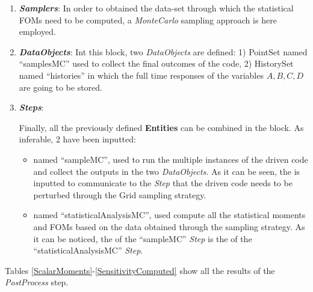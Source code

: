 \begin{enumerate}
\begin{itemize}
  \end{itemize}
   \item \textbf{\textit{Samplers}}:
  In order to obtained the data-set through which the statistical FOMs need to be computed, a \textit{MonteCarlo} sampling approach is here employed.
   \item \textbf{\textit{DataObjects}}:
  Int this block, two \textit{DataObjects} are defined:
  1) PointSet named ``samplesMC'' used to collect the final outcomes of
  the code,
  2) HistorySet named ``histories'' in which the full time responses of the
  variables $A,B,C,D$ are going to be stored.

   \item \textbf{\textit{Steps}}:

   Finally, all the previously defined \textbf{Entities} can be combined in
   the  block. As inferable,
   2  have been inputted:
   \begin{itemize}
     \item {} named ``sampleMC'', used to run the
     multiple
     instances of the driven code and
     collect the outputs in the two \textit{DataObjects}. As it can be
     seen, the  is inputted to communicate to the
     \textit{Step} that the driven code needs to
     be perturbed through the Grid sampling strategy.
     \item {} named ``statisticalAnalysisMC'', used
     compute all the statistical moments and FOMs based on the
     data obtained through the sampling strategy. As it can be noticed,
     the  of the ``sampleMC'' \textit{Step} is the
      of the ``statisticalAnalysisMC''  \textit{Step}.
   \end{itemize}
\end{enumerate}

Tables \ref{ScalarMoments}-\ref{SensitivityComputed} show all the results of the \textit{PostProcess}
step.


